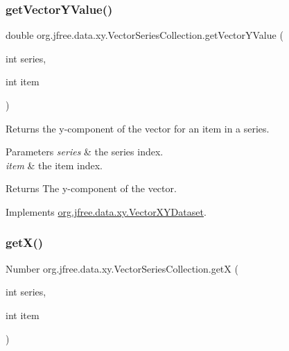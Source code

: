 \mbox{\label{classorg_1_1jfree_1_1data_1_1xy_1_1_vector_series_collection_a70d900e7ff5c26b9b94b607b820d6567}} 
\subsubsection{\texorpdfstring{get\+Vector\+Y\+Value()}{getVectorYValue()}}
{\footnotesize\ttfamily double org.\+jfree.\+data.\+xy.\+Vector\+Series\+Collection.\+get\+Vector\+Y\+Value (\begin{DoxyParamCaption}\item[{int}]{series,  }\item[{int}]{item }\end{DoxyParamCaption})}

Returns the y-\/component of the vector for an item in a series.


\begin{DoxyParams}{Parameters}
{\em series} & the series index. \\
\hline
{\em item} & the item index.\\
\hline
\end{DoxyParams}
\begin{DoxyReturn}{Returns}
The y-\/component of the vector. 
\end{DoxyReturn}


Implements \mbox{\hyperlink{interfaceorg_1_1jfree_1_1data_1_1xy_1_1_vector_x_y_dataset_ac3a14bcfbf867f625abfe605a20d1d54}{org.\+jfree.\+data.\+xy.\+Vector\+X\+Y\+Dataset}}.

\mbox{\label{classorg_1_1jfree_1_1data_1_1xy_1_1_vector_series_collection_ad7741f58379e334e2e027b5c0446fd45}} 
\subsubsection{\texorpdfstring{get\+X()}{getX()}}
{\footnotesize\ttfamily Number org.\+jfree.\+data.\+xy.\+Vector\+Series\+Collection.\+getX (\begin{DoxyParamCaption}\item[{int}]{series,  }\item[{int}]{item }\end{DoxyParamCaption})}

